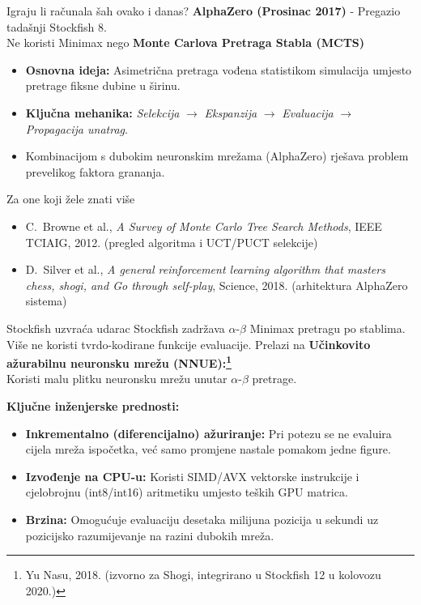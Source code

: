 \documentclass[aspectratio=43]{beamer}
\begin{document}
\begin{frame}{Igraju li računala šah ovako i danas?}
\textbf{AlphaZero (Prosinac 2017)} - Pregazio tadašnji Stockfish 8.\\
Ne koristi Minimax nego \textbf{Monte Carlova Pretraga Stabla (MCTS)}
\begin{itemize}
		\item \textbf{Osnovna ideja:} Asimetrična pretraga vođena statistikom simulacija umjesto pretrage fiksne dubine u širinu.
		\pause
		\vspace{0.2cm}
		\item \textbf{Ključna mehanika:} 
		\textit{Selekcija} $\to$ \textit{Ekspanzija} $\to$ \textit{Evaluacija} $\to$ \textit{Propagacija unatrag}.
		\pause
		\vspace{0.2cm}
		\item Kombinacijom s dubokim neuronskim mrežama (AlphaZero) rješava problem prevelikog faktora grananja.
	\end{itemize}

	\pause
	\vspace{0.4cm}
	\begin{block}{Za one koji žele znati više}
		\footnotesize
		\begin{itemize}
			\item C.~Browne et al., \emph{A Survey of Monte Carlo Tree Search Methods}, IEEE TCIAIG, 2012. (pregled algoritma i UCT/PUCT selekcije)
			\item D.~Silver et al., \emph{A general reinforcement learning algorithm that masters chess, shogi, and Go through self-play}, Science, 2018. (arhitektura AlphaZero sistema)
		\end{itemize}
	\end{block}
\end{frame}

\begin{frame}{Stockfish uzvraća udarac}
Stockfish zadržava $\alpha$-$\beta$ Minimax pretragu po stablima.
Više ne koristi tvrdo-kodirane funkcije evaluacije. Prelazi na \textbf{Učinkovito ažurabilnu neuronsku mrežu (NNUE):\footnote{Yu Nasu, 2018. (izvorno za Shogi, integrirano u Stockfish 12 u kolovozu 2020.)}}\\
Koristi malu plitku neuronsku mrežu unutar $\alpha$-$\beta$ pretrage.

\textbf{Ključne inženjerske prednosti:}
	\begin{itemize}
		\item \textbf{Inkrementalno (diferencijalno) ažuriranje:} Pri potezu se ne evaluira cijela mreža ispočetka, već samo promjene nastale pomakom jedne figure.
		\pause
		\item \textbf{Izvođenje na CPU-u:} Koristi SIMD/AVX vektorske instrukcije i cjelobrojnu (int8/int16) aritmetiku umjesto teških GPU matrica.
		\pause
		\item \textbf{Brzina:} Omogućuje evaluaciju desetaka milijuna pozicija u sekundi uz pozicijsko razumijevanje na razini dubokih mreža.
	\end{itemize}
\end{frame}
\end{document}
